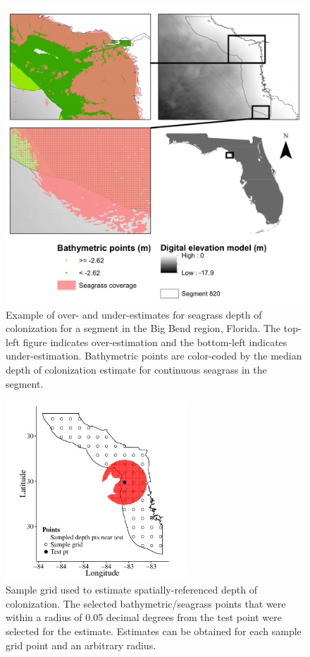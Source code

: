 \documentclass[letterpaper,12pt,oneside]{article}\usepackage[]{graphicx}\usepackage[]{color}
\begin{document}
\begin{figure}
\centerline{\includegraphics[width = \textwidth]{figs/wbid_doc2.pdf}}
\caption{Example of over- and under-estimates for seagrass depth of colonization for a segment in the Big Bend region, Florida.  The top-left figure indicates over-estimation and the bottom-left indicates under-estimation.  Bathymetric points are color-coded by the median depth of colonization estimate for continuous seagrass in the segment.}
\label{fig:wbid_doc2}
\end{figure}

\begin{figure}
\centerline{\includegraphics[width = 0.6\textwidth]{figs/buff_ex.pdf}}
\caption{Sample grid used to estimate spatially-referenced depth of colonization.  The selected bathymetric/seagrass points that were within a radius of 0.05 decimal degrees from the test point were selected for the estimate.  Estimates can be obtained for each sample grid point and an arbitrary radius.}
\label{fig:buff_ex}
\end{figure}
\end{document}
